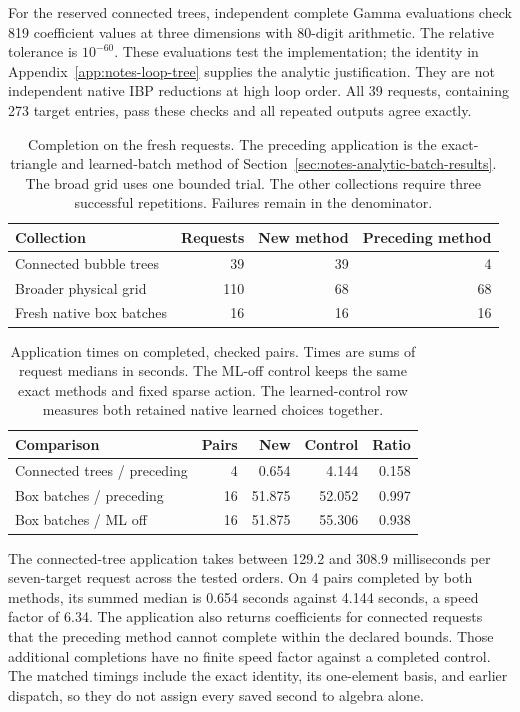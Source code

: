 For the reserved connected trees, independent complete Gamma evaluations check 819 coefficient values at three dimensions with 80-digit arithmetic. The relative tolerance is $10^{-60}$. These evaluations test the implementation; the identity in Appendix~\ref{app:notes-loop-tree} supplies the analytic justification. They are not independent native IBP reductions at high loop order. All 39 requests, containing 273 target entries, pass these checks and all repeated outputs agree exactly.

\begin{table}[!htbp]\centering\small
\caption{Completion on the fresh requests. The preceding application is the exact-triangle and learned-batch method of Section~\ref{sec:notes-analytic-batch-results}. The broad grid uses one bounded trial. The other collections require three successful repetitions. Failures remain in the denominator.}
\label{tab:notes-loop-tree-completion}
\begin{tabularx}{\linewidth}{@{}Yrrr@{}}\toprule
Collection & Requests & New method & Preceding method\\\midrule
Connected bubble trees & 39 & 39 & 4 \\
Broader physical grid & 110 & 68 & 68 \\
Fresh native box batches & 16 & 16 & 16 \\
\bottomrule\end{tabularx}\end{table}

\begin{table}[!htbp]\centering\small
\caption{Application times on completed, checked pairs. Times are sums of request medians in seconds. The ML-off control keeps the same exact methods and fixed sparse action. The learned-control row measures both retained native learned choices together.}
\label{tab:notes-loop-tree-times}
\begin{tabularx}{\linewidth}{@{}Yrrrr@{}}\toprule
Comparison & Pairs & New & Control & Ratio\\\midrule
Connected trees / preceding & 4 & 0.654 & 4.144 & 0.158 \\
Box batches / preceding & 16 & 51.875 & 52.052 & 0.997 \\
Box batches / ML off & 16 & 51.875 & 55.306 & 0.938 \\
\bottomrule\end{tabularx}\end{table}

The connected-tree application takes between 129.2 and 308.9 milliseconds per seven-target request across the tested orders. On 4 pairs completed by both methods, its summed median is 0.654 seconds against 4.144 seconds, a speed factor of 6.34. The application also returns coefficients for connected requests that the preceding method cannot complete within the declared bounds. Those additional completions have no finite speed factor against a completed control. The matched timings include the exact identity, its one-element basis, and earlier dispatch, so they do not assign every saved second to algebra alone.

